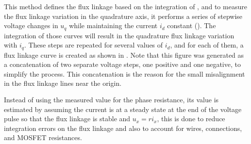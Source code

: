 This method defines the flux linkage based on the integration of , and to measure the flux linkage variation in the quadrature axis, it performs a series of stepwise voltage changes in $u_q$ while maintaining the current $i_d$ constant (). The integration of those curves will result in the quadrature flux linkage variation with $i_q$. These steps are repeated for several values of $i_d$, and for each of them, a flux linkage curve is created as shown in . Note that this figure was generated as a concatenation of two separate voltage steps, one positive and one negative, to simplify the process. This concatenation is the reason for the small misalignment in the flux linkage lines near the origin.

Instead of using the measured value for the phase resistance, its value is estimated by assuming the current is at a steady state at the end of the voltage pulse so that the flux linkage is stable and $u_x = ri_x$, this is done to reduce integration errors on the flux linkage and also to account for wires, connections, and MOSFET resistances.

